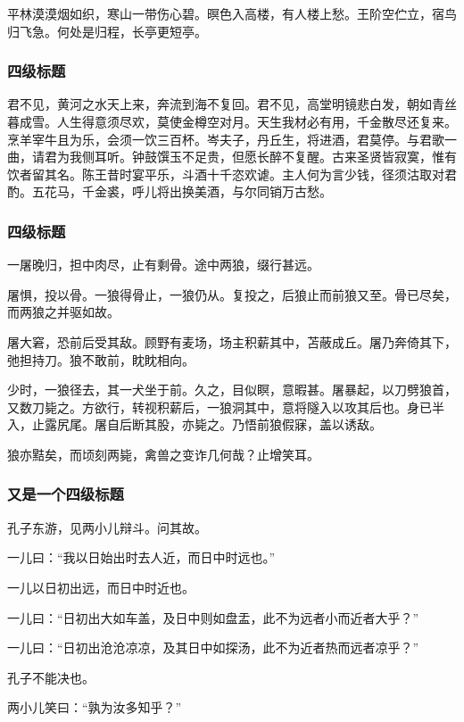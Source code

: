         平林漠漠烟如织，寒山一带伤心碧。暝色入高楼，有人楼上愁。王阶空伫立，宿鸟归飞急。何处是归程，长亭更短亭。

            \subsubsection{四级标题}
                
            君不见，黄河之水天上来，奔流到海不复回。君不见，高堂明镜悲白发，朝如青丝暮成雪。人生得意须尽欢，莫使金樽空对月。天生我材必有用，千金散尽还复来。烹羊宰牛且为乐，会须一饮三百杯。岑夫子，丹丘生，将进酒，君莫停。与君歌一曲，请君为我侧耳听。钟鼓馔玉不足贵，但愿长醉不复醒。古来圣贤皆寂寞，惟有饮者留其名。陈王昔时宴平乐，斗酒十千恣欢谑。主人何为言少钱，径须沽取对君酌。五花马，千金裘，呼儿将出换美酒，与尔同销万古愁。

            \subsubsection{四级标题}

                一屠晚归，担中肉尽，止有剩骨。途中两狼，缀行甚远。

                屠惧，投以骨。一狼得骨止，一狼仍从。复投之，后狼止而前狼又至。骨已尽矣，而两狼之并驱如故。

                屠大窘，恐前后受其敌。顾野有麦场，场主积薪其中，苫蔽成丘。屠乃奔倚其下，弛担持刀。狼不敢前，眈眈相向。

                少时，一狼径去，其一犬坐于前。久之，目似瞑，意暇甚。屠暴起，以刀劈狼首，又数刀毙之。方欲行，转视积薪后，一狼洞其中，意将隧入以攻其后也。身已半入，止露尻尾。屠自后断其股，亦毙之。乃悟前狼假寐，盖以诱敌。

                狼亦黠矣，而顷刻两毙，禽兽之变诈几何哉？止增笑耳。

            \subsubsection{又是一个四级标题}

                孔子东游，见两小儿辩斗。问其故。

                一儿曰：“我以日始出时去人近，而日中时远也。”

                一儿以日初出远，而日中时近也。

                一儿曰：“日初出大如车盖，及日中则如盘盂，此不为远者小而近者大乎？”

                一儿曰：“日初出沧沧凉凉，及其日中如探汤，此不为近者热而远者凉乎？”

                孔子不能决也。

                两小儿笑曰：“孰为汝多知乎？”

